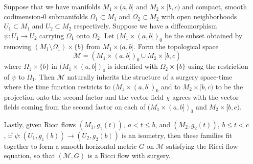 \begin{lemma}
\label{lem:gluing-ricci-flows-with-surgery}
\label{gluingsoln}
Suppose that we have manifolds $M_1\times (a,b]$ and $M_2\times
[b,c)$ and compact, smooth codimension-$0$ submanifolds
$\Omega_1\subset M_1$ and $\Omega_2\subset M_2$ with open
neighborhoods $U_1\subset M_1$ and $U_2\subset M_2$ respectively.
Suppose we have a diffeomorphism $\psi\colon U_1\to U_2$ carrying
$\Omega_1$ onto $\Omega_2$. Let $(M_1\times (a,b])_0$ be the subset
obtained by removing $(M_1\setminus \Omega_1)\times \{b\}$ from
$M_1\times (a,b]$. Form the topological space
$${\mathcal M}=(M_1\times (a,b])_0\cup M_2\times [b,c)$$
where  $\Omega_1\times\{b\}$ in $(M_1\times (a,b])_0$ is identified
with $\Omega_2\times \{b\}$ using the restriction of $\psi$ to
$\Omega_1$. Then ${\mathcal M}$ naturally inherits the structure of
a surgery space-time where the time function restricts to
$(M_1\times (a,b])_0$ and to $M_2\times [b,c)$ to be the projection
onto the second factor and the vector field $\chi$ agrees with the
vector fields coming from the second factor on each of $(M_1\times
(a,b])_0$ and $M_2\times [b,c)$.

 Lastly, given Ricci
flows $(M_1,g_1(t)),\ a<t\le b$, and $(M_2,g_2(t)),\ b\le t<c$, if
$\psi\colon (U_1,g_1(b))\to (U_2,g_2(b))$ is an isometry, then these
families fit together to form a smooth horizontal metric $G$ on
${\mathcal M}$ satisfying the Ricci flow equation, so that
$({\mathcal M},G)$ is a  Ricci flow with surgery.
\end{lemma}


